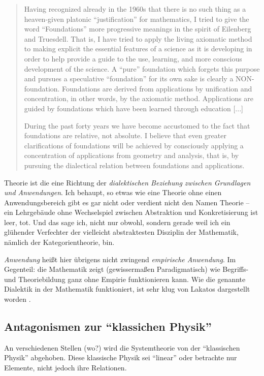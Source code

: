 \documentclass[a4paper, 10pt]{amsart}
\begin{document}
\begin{quotation}
Having recognized already in the 1960s that there is no such thing as a heaven-given platonic ``justification'' for mathematics, I tried to give the word ``Foundations'' more progressive meanings in the spirit of Eilenberg and Truesdell. That is, I have tried to apply the living axiomatic method to making explicit the essential features of a science as it is developing in order to help provide a guide to the use, learning, and more conscious development of the science. A ``pure'' foundation which forgets this purpose and pursues a speculative ``foundation'' for its own sake is clearly a NON-foundation. Foundations are derived from applications by unification and concentration, in other words, by the axiomatic method. Applications are guided by foundations which have been learned through education [...]

During the past forty years we have become accustomed to the fact that foundations are relative, not absolute. I believe that even greater clarifications of foundations will be achieved by consciously applying a concentration of applications from geometry and analysis, that is, by pursuing the dialectical relation between foundations and applications.
\end{quotation}

Theorie ist die eine Richtung der \emph{dialektischen Beziehung zwischen Grundlagen und Anwendungen}. Ich behaupt, so etwas wie eine Theorie ohne einen Anwendungsbereich gibt es gar nicht oder verdient nicht den Namen Theorie -- ein Lehrgebäude ohne Wechselspiel zwischen Abstraktion und Konkretisierung ist leer, tot. Und das sage ich, nicht nur obwohl, sondern gerade weil ich ein glühender Verfechter der vielleicht abstraktesten Disziplin der Mathematik, nämlich der Kategorientheorie, bin.

\emph{Anwendung} heißt hier übrigens nicht zwingend \emph{empirische Anwendung}. Im Gegenteil: die Mathematik zeigt (gewissermaßen Paradigmatisch) wie Begriffs- und Theoriebildung ganz ohne Empirie funktionieren kann. Wie die genannte Dialektik in der Mathematik funktioniert, ist sehr klug von Lakatos dargestellt worden \cite{lakatos2015proofs}.
%
\subsection{Antagonismen zur ``klassichen Physik''} An verschiedenen Stellen (wo?) wird die Systemtheorie von der ``klassischen Physik'' abgehoben. Diese klassische Physik sei ``linear'' oder betrachte nur Elemente, nicht jedoch ihre Relationen.
\end{document}
